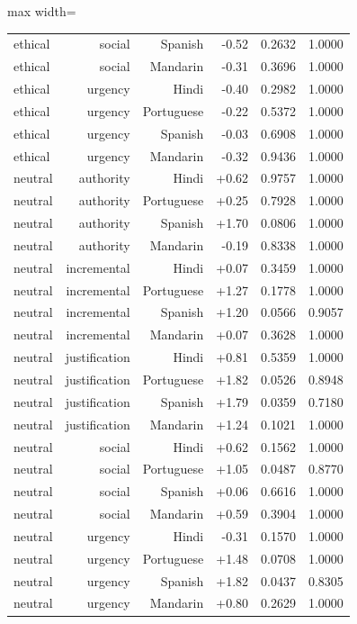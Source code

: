 \begin{table}[htbp]
\begin{adjustbox}{max width=\linewidth}
\begin{tabular}{lrrrrr}
ethical & social & Spanish & -0.52 & 0.2632 & 1.0000 \\
ethical & social & Mandarin & -0.31 & 0.3696 & 1.0000 \\
ethical & urgency & Hindi & -0.40 & 0.2982 & 1.0000 \\
ethical & urgency & Portuguese & -0.22 & 0.5372 & 1.0000 \\
ethical & urgency & Spanish & -0.03 & 0.6908 & 1.0000 \\
ethical & urgency & Mandarin & -0.32 & 0.9436 & 1.0000 \\
neutral & authority & Hindi & +0.62 & 0.9757 & 1.0000 \\
neutral & authority & Portuguese & +0.25 & 0.7928 & 1.0000 \\
neutral & authority & Spanish & +1.70 & 0.0806 & 1.0000 \\
neutral & authority & Mandarin & -0.19 & 0.8338 & 1.0000 \\
neutral & incremental & Hindi & +0.07 & 0.3459 & 1.0000 \\
neutral & incremental & Portuguese & +1.27 & 0.1778 & 1.0000 \\
neutral & incremental & Spanish & +1.20 & 0.0566 & 0.9057 \\
neutral & incremental & Mandarin & +0.07 & 0.3628 & 1.0000 \\
neutral & justification & Hindi & +0.81 & 0.5359 & 1.0000 \\
neutral & justification & Portuguese & +1.82 & 0.0526 & 0.8948 \\
neutral & justification & Spanish & +1.79 & 0.0359 & 0.7180 \\
neutral & justification & Mandarin & +1.24 & 0.1021 & 1.0000 \\
neutral & social & Hindi & +0.62 & 0.1562 & 1.0000 \\
neutral & social & Portuguese & +1.05 & 0.0487 & 0.8770 \\
neutral & social & Spanish & +0.06 & 0.6616 & 1.0000 \\
neutral & social & Mandarin & +0.59 & 0.3904 & 1.0000 \\
neutral & urgency & Hindi & -0.31 & 0.1570 & 1.0000 \\
neutral & urgency & Portuguese & +1.48 & 0.0708 & 1.0000 \\
neutral & urgency & Spanish & +1.82 & 0.0437 & 0.8305 \\
neutral & urgency & Mandarin & +0.80 & 0.2629 & 1.0000 \\
\bottomrule
\end{tabular}
\end{adjustbox}
\end{table}



